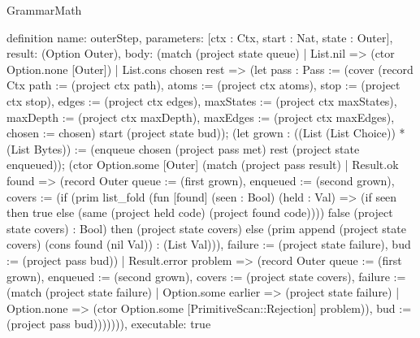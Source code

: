 \begin{lexlean}{GrammarMath}
\begin{semanticmodule}
{{{definition{
  name: outerStep,
  parameters: [ctx : Ctx, start : Nat, state : Outer],
  result: (Option Outer),
  body: (match (project state queue)
    | List.nil => (ctor Option.none [Outer])
    | List.cons chosen rest => (let pass : Pass := (cover (record Ctx {path := (project ctx path), atoms := (project ctx atoms), stop := (project ctx stop), edges := (project ctx edges), maxStates := (project ctx maxStates), maxDepth := (project ctx maxDepth), maxEdges := (project ctx maxEdges), chosen := chosen}) start (project state bud)); (let grown : ((List (List Choice)) * (List Bytes)) := (enqueue chosen (project pass met) rest (project state enqueued)); (ctor Option.some [Outer] (match (project pass result)
      | Result.ok found => (record Outer {queue := (first grown), enqueued := (second grown), covers := (if (prim list_fold (fun [found] (seen : Bool) (held : Val) => (if seen then true else (same (project held code) (project found code)))) false (project state covers) : Bool) then (project state covers) else (prim append (project state covers) (cons found (nil Val)) : (List Val))), failure := (project state failure), bud := (project pass bud)})
      | Result.error problem => (record Outer {queue := (first grown), enqueued := (second grown), covers := (project state covers), failure := (match (project state failure)
        | Option.some earlier => (project state failure)
        | Option.none => (ctor Option.some [PrimitiveScan::Rejection] problem)), bud := (project pass bud)})))))),
  executable: true
}

}}}
\end{semanticmodule}
\end{lexlean}
